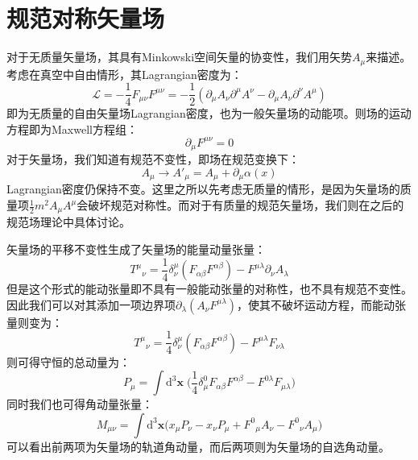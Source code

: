 \section{规范对称矢量场}
对于无质量矢量场，其具有Minkowski空间矢量的协变性，我们用矢势$A_\mu$来描述。考虑在真空中自由情形，其Lagrangian密度为：
\begin{equation}
\mathscr{L}=-\frac{1}{4}F_{\mu\nu}F^{\mu\nu}=-\frac{1}{2}(\partial_\mu A_\nu \partial^\mu A^\nu-\partial_\mu A_\nu \partial^\nu A^\mu)
\end{equation}
即为无质量的自由矢量场Lagrangian密度，也为一般矢量场的动能项。则场的运动方程即为Maxwell方程组：
\begin{equation}
\partial_\mu F^{\mu\nu}=0
\end{equation}
对于矢量场，我们知道有规范不变性，即场在规范变换下：
\begin{equation}
A_\mu\rightarrow A'_\mu=A_\mu+\partial_\mu\alpha(x)
\end{equation}
Lagrangian密度仍保持不变。这里之所以先考虑无质量的情形，是因为矢量场的质量项$\frac{1}{2}m^2A_\mu A^\mu$会破坏规范对称性。而对于有质量的规范矢量场，我们则在之后的规范场理论中具体讨论。

矢量场的平移不变性生成了矢量场的能量动量张量：
\begin{equation}
{T^\mu}_\nu=\frac{1}{4}\delta^\mu_\nu(F_{\alpha\beta}F^{\alpha\beta})-F^{\mu\lambda}\partial_\nu A_\lambda
\end{equation}
但是这个形式的能动张量即不具有一般能动张量的对称性，也不具有规范不变性。因此我们可以对其添加一项边界项$\partial_{\lambda}(A_\nu F^{\mu\lambda})$，使其不破坏运动方程，而能动张量则变为：
\begin{equation}
{T^\mu}_\nu=\frac{1}{4}\delta^\mu_\nu(F_{\alpha\beta}F^{\alpha\beta})-F^{\mu\lambda}F_{\nu\lambda}
\end{equation}
则可得守恒的总动量为：
\begin{equation}
P_\mu=\int\mathrm{d}^3\boldsymbol{x}\; \Big(\frac{1}{4}\delta^0_\mu F_{\alpha\beta}F^{\alpha\beta}-F^{0\lambda}F_{\mu\lambda}\Big)
\end{equation}
同时我们也可得角动量张量：
\begin{equation}
M_{\mu\nu}=\int\mathrm{d}^3\boldsymbol{x}\Big(x_\mu P_\nu-x_\nu P_\mu+ {F^0}_\mu A_\nu-{F^0}_\nu A_\mu \Big)
\end{equation}
可以看出前两项为矢量场的轨道角动量，而后两项则为矢量场的自选角动量。
